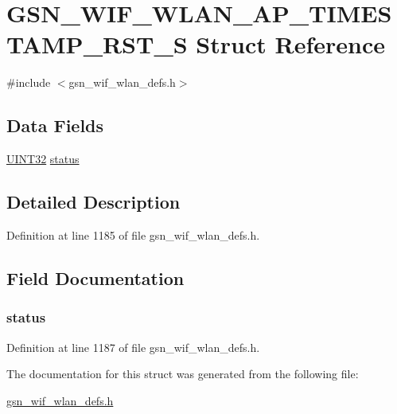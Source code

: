 \hypertarget{a00369}{
\section{GSN\_\-WIF\_\-WLAN\_\-AP\_\-TIMESTAMP\_\-RST\_\-S Struct Reference}
\label{a00369}
}


{\ttfamily \#include $<$gsn\_\-wif\_\-wlan\_\-defs.h$>$}

\subsection*{Data Fields}
\begin{DoxyCompactItemize}
\item 
\hyperlink{a00660_gae1e6edbbc26d6fbc71a90190d0266018}{UINT32} \hyperlink{a00369_ac6b7193d1fe7063cf448ef96398230d8}{status}
\end{DoxyCompactItemize}


\subsection{Detailed Description}


Definition at line 1185 of file gsn\_\-wif\_\-wlan\_\-defs.h.



\subsection{Field Documentation}
\hypertarget{a00369_ac6b7193d1fe7063cf448ef96398230d8}{
\subsubsection[{status}]{ {\bf status}}}
\label{a00369_ac6b7193d1fe7063cf448ef96398230d8}


Definition at line 1187 of file gsn\_\-wif\_\-wlan\_\-defs.h.



The documentation for this struct was generated from the following file:\begin{DoxyCompactItemize}
\item 
\hyperlink{a00613}{gsn\_\-wif\_\-wlan\_\-defs.h}\end{DoxyCompactItemize}
